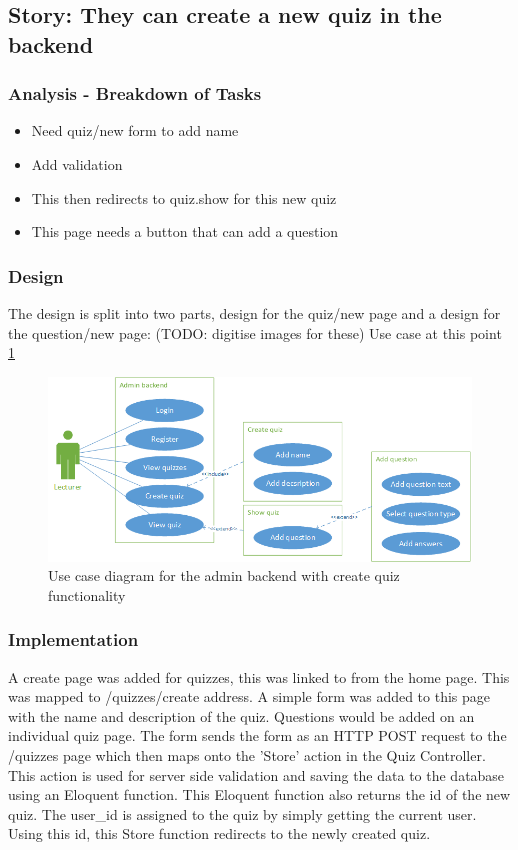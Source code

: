 \subsection{Story: They can create a new quiz in the backend}
\subsubsection{Analysis - Breakdown of Tasks}
\begin{itemize}
	\item Need quiz/new form to add name
	\item Add validation
	\item This then redirects to quiz.show for this new quiz
	\item This page needs a button that can add a question
\end{itemize}
\subsubsection{Design}
The design is split into two parts, design for the quiz/new page and a design for the question/new page:
(TODO: digitise images for these)
Use case at this point \ref{fig:quiz-create-use-case}
\begin{figure}
	\caption{Use case diagram for the admin backend with create quiz functionality}
	\centerline{\includegraphics{Chapter2/Iter-2/iter-2-use-case-create}}
	\label{fig:quiz-create-use-case}
\end{figure}
\subsubsection{Implementation}
A create page was added for quizzes, this was linked to from the home page. This was mapped to /quizzes/create address. A simple form was added to this page with the name and description of the quiz. Questions would be added on an individual quiz page. The form sends the form as an HTTP POST request to the /quizzes page which then maps onto the 'Store' action in the Quiz Controller. This action is used for server side validation and saving the data to the database using an Eloquent function. This Eloquent function also returns the id of the new quiz. The user\_id is assigned to the quiz by simply getting the current user. Using this id, this Store function redirects to the newly created quiz.

